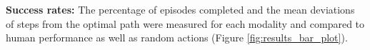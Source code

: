 \textbf{Success rates:} The percentage of episodes completed and the mean deviations of steps from the optimal path were measured for each modality and compared to human performance as well as random actions (Figure \ref{fig:results_bar_plot}).